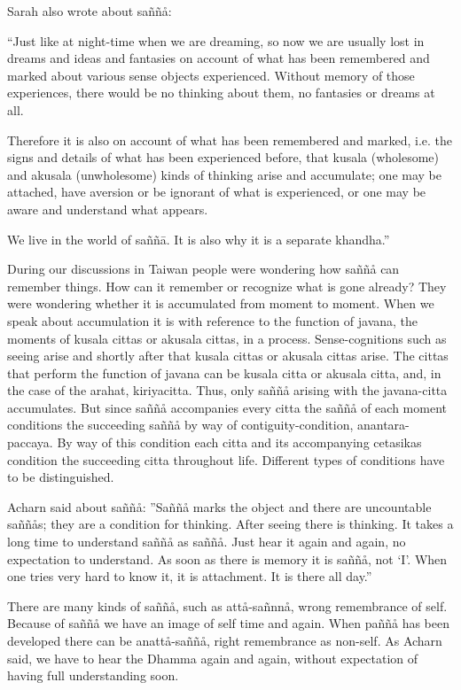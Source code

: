 \documentclass[10pt,a4paper,final]{article}
\begin{document}
Sarah also wrote about saññå: 

``Just like at night-time when we are
dreaming, so now we are usually
lost in dreams and ideas and
fantasies on account of what has been remembered and marked about
various sense objects experienced. Without memory of those experiences,
there would be no thinking about them, no fantasies or dreams at all.

Therefore it is also on account of what
has been remembered and marked, i.e. the signs and details of what has
been experienced before, that kusala (wholesome) and akusala
(unwholesome) kinds of thinking arise and accumulate;
one may be attached,
have aversion or
be ignorant of what is
experienced, or one may be
aware and understand what appears. 

We live in
the world of saññā. It is also why
it is a separate
khandha.''

During our discussions in Taiwan people were wondering how
saññå can remember things. How can it remember or recognize what is gone
already? They were wondering whether it is accumulated from moment to
moment. When we speak about accumulation it is with reference to the
function of javana, the moments of kusala cittas or akusala cittas, in a
process. Sense-cognitions such as seeing arise and shortly after that
kusala cittas or akusala cittas arise. The cittas that perform the
function of javana can be kusala citta or akusala citta, and, in the
case of the arahat, kiriyacitta. Thus, only saññå arising with the
javana-citta accumulates. But since saññå accompanies every citta the
saññå of each moment conditions the succeeding saññå by way of
contiguity-condition, anantara-paccaya. By way of this condition each
citta and its accompanying cetasikas condition the succeeding citta
throughout life. Different types of conditions have to be
distinguished.

Acharn said about saññå: ''Saññå marks the object and there
are uncountable saññås; they are a condition for thinking. After seeing
there is thinking. It takes a long time to understand saññå as saññå.
Just hear it again and again, no expectation to understand. As soon as
there is memory it is saññå, not `I'. When one tries very hard to know
it, it is attachment. It is there all day.''

There are many kinds of saññå, such as attå-sañnnå, wrong
remembrance of self. Because of saññå we have an image of self time and
again. When paññå has been developed there can be anattå-saññå, right
remembrance as non-self. As Acharn said, we have to hear the Dhamma
again and again, without expectation of having full understanding soon.
\end{document}
